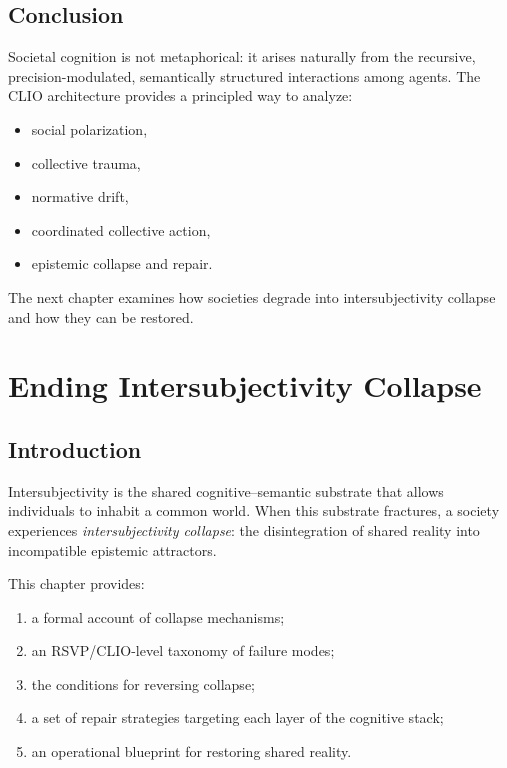 \documentclass[12pt,oneside]{book}
\theoremstyle{plain}
\theoremstyle{definition}
\begin{document}
\section{Conclusion}

Societal cognition is not metaphorical:  
it arises naturally from the recursive, precision-modulated, semantically structured 
interactions among agents.  
The CLIO architecture provides a principled way to analyze:

\begin{itemize}
    \item social polarization,
    \item collective trauma,
    \item normative drift,
    \item coordinated collective action,
    \item epistemic collapse and repair.
\end{itemize}

The next chapter examines how societies degrade into intersubjectivity collapse 
and how they can be restored.

\chapter{Ending Intersubjectivity Collapse}

\section{Introduction}

Intersubjectivity is the shared cognitive–semantic substrate that allows 
individuals to inhabit a common world.  
When this substrate fractures, a society experiences \emph{intersubjectivity 
collapse}:  
the disintegration of shared reality into incompatible epistemic attractors.

This chapter provides:

\begin{enumerate}
    \item a formal account of collapse mechanisms;
    \item an RSVP/CLIO-level taxonomy of failure modes;
    \item the conditions for reversing collapse;
    \item a set of repair strategies targeting each layer of the cognitive stack;
    \item an operational blueprint for restoring shared reality.
\end{enumerate}
\end{document}
